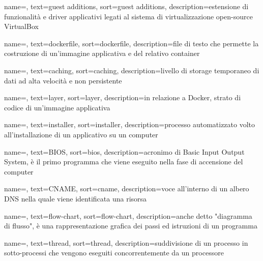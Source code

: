 {
    name=,
    text=guest additions,
    sort=guest additions, 
    description={estensione di funzionalità e driver applicativi legati al sistema di virtualizzazione open-source VirtualBox}
}

{
    name=,
    text=dockerfile,
    sort=dockerfile, 
    description={file di testo che permette la costruzione di un'immagine applicativa e del relativo container}
}

{
    name=,
    text=caching,
    sort=caching, 
    description={livello di storage temporaneo di dati ad alta velocità e non persistente}
}

{
    name=,
    text=layer,
    sort=layer, 
    description={in relazione a Docker, strato di codice di un'immagine applicativa}
}

{
    name=,
    text=installer,
    sort=installer, 
    description={processo automatizzato volto all'installazione di un applicativo su un computer}
}

{
    name=,
    text=BIOS,
    sort=bios, 
    description={acronimo di Basic Input Output System, è il primo programma che viene eseguito nella fase di accensione del computer}
}

{
    name=,
    text=CNAME,
    sort=cname, 
    description={voce all'interno di un albero DNS nella quale viene identificata una risorsa}
}

{
    name=,
    text=flow-chart,
    sort=flow-chart, 
    description={anche detto "diagramma di flusso", è una rappresentazione grafica dei passi ed istruzioni di un programma}
}

{
    name=,
    text=thread,
    sort=thread, 
    description={suddivisione di un processo in sotto-processi che vengono eseguiti concorrentemente da un processore}
}

